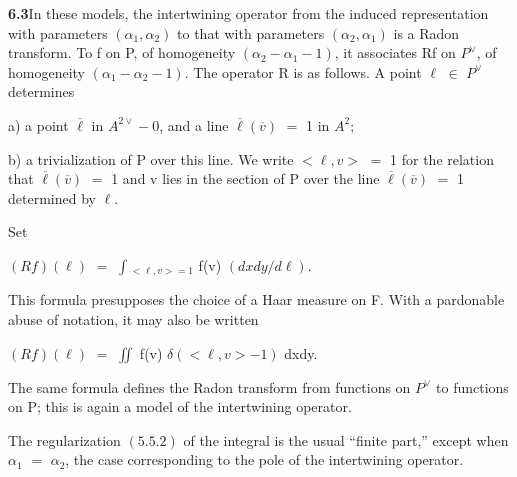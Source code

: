 \documentclass[10pt,a4paper]{article}
\begin{document}
\clearpage
{}
\label{d035-physical-029}
\par\noindent\textbf{6.3}\quad In these models, the intertwining operator from the induced representation with parameters $(\alpha{}_1,\alpha{}_2)$ to that with parameters $(\alpha{}_2,\alpha{}_1)$ is a Radon transform. To f on P, of homogeneity $(\alpha{}_2-\alpha{}_1-1)$, it associates Rf on $P^\vee{}$, of homogeneity $(\alpha{}_1-\alpha{}_2-1)$. The operator R is as follows. A point $\ell{}$ $\in{}$ $P^\vee{}$ determines\par
\par a) a point $\overline{\ell{}}$ in $A^{2\vee{}}-{0}$, and a line $\overline{\ell{}}(\overline{v})$ $=$ 1 in $A^2$;\par
\par b) a trivialization of P over this line. We write $<\ell{},v>$ $=$ 1 for the relation that $\overline{\ell{}}(\overline{v})$ $=$ 1 and v lies in the section of P over the line $\overline{\ell{}}(\overline{v})$ $=$ 1 determined by $\ell{}$.\par
\par Set\par
\par\smallskip\begin{center}\begin{minipage}{0.96\textwidth}\centering
$(Rf)(\ell{})$ $=$ $\int{}_{<\ell{},v>=1}$ f(v) $(dxdy/d\ell{})$.
\end{minipage}\end{center}\smallskip
\par This formula presupposes the choice of a Haar measure on F. With a pardonable abuse of notation, it may also be written\par
\par\smallskip\begin{center}\begin{minipage}{0.96\textwidth}\centering
$(Rf)(\ell{})$ $=$ $\iint{}$ f(v) $\delta{}(<\ell{},v>-1)$ dxdy.
\end{minipage}\end{center}\smallskip
\par The same formula defines the Radon transform from functions on $P^\vee{}$ to functions on P; this is again a model of the intertwining operator.\par
\par The regularization $(5.5.2)$ of the integral is the usual ``finite part,'' except when $\alpha{}_1$ $=$ $\alpha{}_2$, the case corresponding to the pole of the intertwining operator.\par
\end{document}
